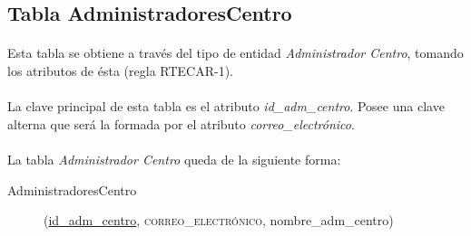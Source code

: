    \subsection{Tabla AdministradoresCentro}

      \paragraph{}Esta tabla se obtiene a través del tipo de entidad
      \textit{Administrador Centro}, tomando los atributos de ésta (regla
      RTECAR-1).

      \paragraph{}La clave principal de esta tabla es el atributo
      \textit{id\_adm\_centro}. Posee una clave alterna que será la formada por
      el atributo \textit{correo\_electrónico}.

      \paragraph{}La tabla \textit{Administrador Centro} queda de la siguiente
      forma:

      \begin{description}
         \item[AdministradoresCentro] \begin{flushleft}(\underline{id\_adm\_centro},
         \textsc{correo\_electrónico}, nombre\_adm\_centro)\end{flushleft}
      \end{description}
